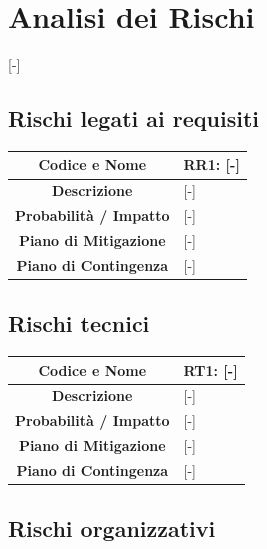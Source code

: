 \section{Analisi dei Rischi}
[-]

\subsection{Rischi legati ai requisiti}

\begin{table}[H]
	\centering
	\renewcommand{\arraystretch}{1.3}
	\begin{tabularx}{\textwidth}{|c|X|}
		\hline
		\textbf{Codice e Nome} & \textbf{RR1: [-]} \\
		\hline
		\textbf{Descrizione} & [-] \\
		\hline
		\textbf{Probabilità / Impatto} & [-] \\
		\hline
		\textbf{Piano di Mitigazione} & [-] \\
		\hline
		\textbf{Piano di Contingenza} & [-] \\
		\hline
	\end{tabularx}
\end{table}

\subsection{Rischi tecnici}

\begin{table}[H]
	\centering
	\renewcommand{\arraystretch}{1.3}
	\begin{tabularx}{\textwidth}{|c|X|}
		\hline
		\textbf{Codice e Nome} & \textbf{RT1: [-]} \\
		\hline
		\textbf{Descrizione} & [-] \\
		\hline
		\textbf{Probabilità / Impatto} & [-] \\
		\hline
		\textbf{Piano di Mitigazione} & [-] \\
		\hline
		\textbf{Piano di Contingenza} & [-] \\
		\hline
	\end{tabularx}
\end{table}

\subsection{Rischi organizzativi}

